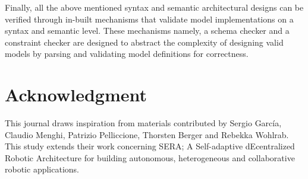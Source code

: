 \documentclass[conference]{IEEEtran}
\begin{document}
Finally, all the above mentioned syntax and semantic architectural designs can be verified through in-built mechanisms that validate model implementations on a syntax and semantic level. These mechanisms namely, a schema checker and a constraint checker are designed to abstract the complexity of designing valid models by parsing and validating model definitions for correctness. 

\section*{Acknowledgment}
This journal draws inspiration from materials contributed by Sergio Garc\'{i}a, Claudio Menghi, Patrizio Pelliccione, Thorsten Berger and Rebekka Wohlrab. This study extends their work concerning SERA; A Self-adaptive dEcentralized Robotic Architecture for building autonomous, heterogeneous and collaborative robotic applications. 
\end{document}
